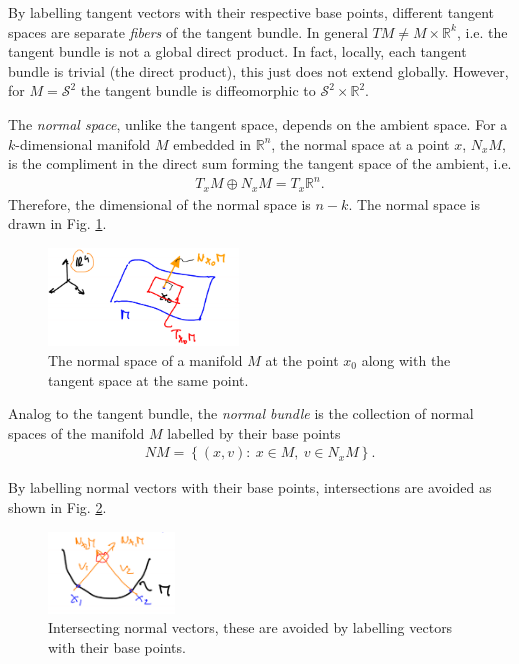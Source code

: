 By labelling tangent vectors with their respective base points, different tangent spaces are separate \emph{fibers} of the tangent bundle. In general $TM \neq M \times \mathbb{R}^{k}$, i.e. the tangent bundle is not a global direct product. In fact, locally, each tangent bundle is trivial (the direct product), this just does not extend globally. However, for $M=\mathcal{S}^{2}$ the tangent bundle is diffeomorphic to $\mathcal{S}^{2} \times \mathbb{R}^{2}$. 

\begin{definition}
	The \emph{normal space}, unlike the tangent space, depends on the ambient space. For a $k$-dimensional manifold $M$ embedded in $\mathbb{R}^{n}$, the normal space at a point $x$, $N_{x}M$, is the compliment in the direct sum forming the tangent space of the ambient, i.e.
	\begin{align}
		\boxed{
			T_{x}M \oplus N_{x}M = T_{x}\mathbb{R}^{n}.
		}
	\end{align}
	Therefore, the dimensional of the normal space is $n-k$. The normal space is drawn in Fig. \ref{fig:normal_space_def}.	
	\begin{figure}[h!]
		\centering
		\includegraphics[width=0.45\textwidth]{figures/ch9/8normal_space_def.png}
		\caption{The normal space of a manifold $M$ at the point $x_0$ along with the tangent space at the same point.}
		\label{fig:normal_space_def}
	\end{figure}
\end{definition}

\begin{definition}
	Analog to the tangent bundle, the \emph{normal bundle} is the collection of normal spaces of the manifold $M$ labelled by their base points
	\begin{align}
	\boxed{
		NM = \left\{ (x,v):\ x\in M,\ v\in N_{x}M \right\}.
	}
	\end{align}
\end{definition}
By labelling normal vectors with their base points, intersections are avoided as shown in Fig. \ref{fig:normal_vector_intersection}.
\begin{figure}[h!]
	\centering
	\includegraphics[width=0.3\textwidth]{figures/ch9/9normal_vector_intersection.png}
	\caption{Intersecting normal vectors, these are avoided by labelling vectors with their base points.}
	\label{fig:normal_vector_intersection}
\end{figure}


